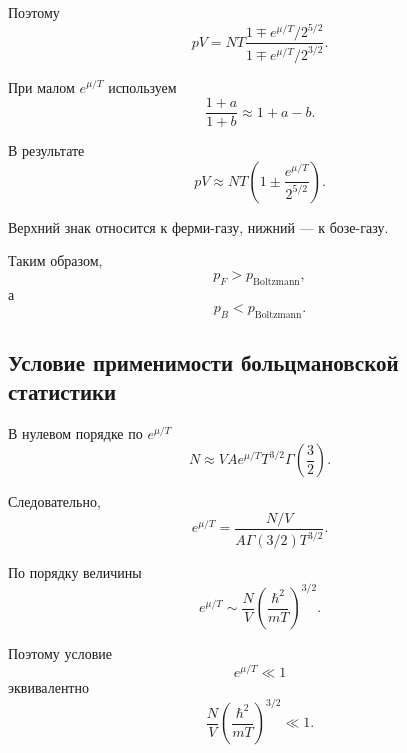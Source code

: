 \documentclass[../final.tex]{subfiles}
\begin{document}
Поэтому
%
\begin{equation*}
    pV
    =
    NT
    \frac{
        1
        \mp
        e^{\mu/T}/2^{5/2}
    }{
        1
        \mp
        e^{\mu/T}/2^{3/2}
    }.
\end{equation*}

При малом $e^{\mu/T}$ используем
%
\begin{equation*}
    \frac{1+a}{1+b}
    \approx
    1+a-b.
\end{equation*}

В результате
%
\[
    \boxed{
        pV
        \approx
        NT
        \left(
            1
            \pm
            \frac{
                e^{\mu/T}
            }{
                2^{5/2}
            }
        \right)
    }.
\]

Верхний знак относится к ферми-газу, нижний --- к бозе-газу.

Таким образом,
%
\begin{equation*}
    p_F
    >
    p_{\mathrm{Boltzmann}},
\end{equation*}
%
а
%
\begin{equation*}
    p_B
    <
    p_{\mathrm{Boltzmann}}.
\end{equation*}


\subsection{Условие применимости больцмановской статистики}

В нулевом порядке по $e^{\mu/T}$
%
\begin{equation*}
    N
    \approx
    VA
    e^{\mu/T}
    T^{3/2}
    \Gamma
    \left(
        \frac{3}{2}
    \right).
\end{equation*}

Следовательно,
%
\begin{equation*}
    e^{\mu/T}
    =
    \frac{
        N/V
    }{
        A
        \Gamma(3/2)
        T^{3/2}
    }.
\end{equation*}

По порядку величины
%
\begin{equation*}
    e^{\mu/T}
    \sim
    \frac{N}{V}
    \left(
        \frac{\hbar^2}{mT}
    \right)^{3/2}.
\end{equation*}

Поэтому условие
%
\begin{equation*}
    e^{\mu/T}
    \ll
    1
\end{equation*}
%
эквивалентно
%
\[
    \boxed{
        \frac{N}{V}
        \left(
            \frac{\hbar^2}{mT}
        \right)^{3/2}
        \ll
        1
    }.
\]
\end{document}
